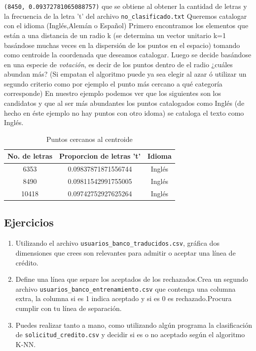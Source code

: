 \documentclass{article}
\begin{document}
\verb#(8450, 0.09372781065088757)# que se obtiene al obtener la cantidad de letras y la frecuencia de la letra 't' del archivo \verb#no_clasificado.txt#
Queremos catalogar con el idioma (Inglés,Alemán o Español)
Primero encontramos los elementos que están a una distancia de un radio k (se determina un vector unitario k=1 basándose muchas veces en la dispersión de los puntos en el espacio) tomando como centroide la coordenada que deseamos catalogar.
Luego se decide basándose en una especie de \textit{votación}, es decir de los puntos dentro de el radio ¿cuáles abundan más?
(Si empatan el algoritmo puede ya sea elegir al azar ó utilizar un segundo criterio como por ejemplo el punto más cercano a qué categoría corresponde)
En nuestro ejemplo podemos ver que los siguientes son los candidatos y que al ser más abundantes los puntos catalogados como Inglés (de hecho en éste ejemplo no hay puntos con otro idoma) se cataloga el texto como Inglés.
\begin{table}[h]
\centering
\begin{tabular}{c|c|c}
 No. de letras & Proporcion de letras 't' & Idioma \\
\hline
 6353 &   0.09837871871556744 & Inglés \\
 8490 & 0.09811542991755005 & Inglés \\
 10418 & 0.09742752927625264 & Inglés \\
\end{tabular}
\caption{Puntos cercanos al centroide}
\label{tab:my_label}
\end{table}


\subsection{Ejercicios}
\begin{enumerate}
\item Utilizando el archivo \verb#usuarios_banco_traducidos.csv#, gráfica dos dimensiones que crees son relevantes para admitir o aceptar una línea de crédito.
\item Define una línea que separe los aceptados de los rechazados.Crea un segundo archivo \verb#usuarios_banco_entrenamiento.csv# que contenga una columna extra, la columna si es 1 indica aceptado y si es 0 es rechazado.Procura cumplir con tu línea de separación.
\item Puedes realizar tanto a mano, como utilizando algún programa la clasificación de \verb#solicitud_credito.csv# y decidir si es o no aceptado según el algoritmo K-NN.
\end{enumerate}
\end{document}
